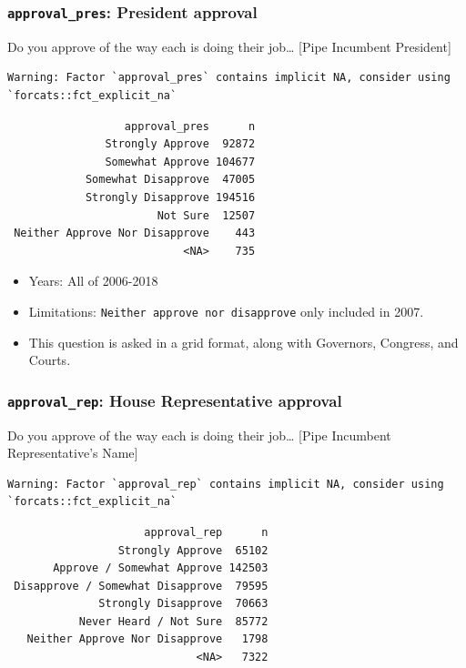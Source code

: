 \documentclass[10pt,article,oneside]{memoir}
\theoremstyle{definition}
\begin{document}
\hypertarget{approval_pres-president-approval}{%
\subsubsection{\texorpdfstring{\texttt{approval\_pres}: President
approval}{approval\_pres: President approval}}\label{approval_pres-president-approval}}

Do you approve of the way each is doing their job\ldots{} {[}Pipe
Incumbent President{]}

\begin{verbatim}
Warning: Factor `approval_pres` contains implicit NA, consider using
`forcats::fct_explicit_na`
\end{verbatim}

\begin{verbatim}
                  approval_pres      n
               Strongly Approve  92872
               Somewhat Approve 104677
            Somewhat Disapprove  47005
            Strongly Disapprove 194516
                       Not Sure  12507
 Neither Approve Nor Disapprove    443
                           <NA>    735
\end{verbatim}

\begin{itemize}
\tightlist
\item
  Years: All of 2006-2018
\item
  Limitations: \texttt{Neither\ approve\ nor\ disapprove} only included
  in 2007.
\item
  This question is asked in a grid format, along with Governors,
  Congress, and Courts.
\end{itemize}

\hypertarget{approval_rep-house-representative-approval}{%
\subsubsection{\texorpdfstring{\texttt{approval\_rep}: House
Representative
approval}{approval\_rep: House Representative approval}}\label{approval_rep-house-representative-approval}}

Do you approve of the way each is doing their job\ldots{} {[}Pipe
Incumbent Representative's Name{]}

\begin{verbatim}
Warning: Factor `approval_rep` contains implicit NA, consider using
`forcats::fct_explicit_na`
\end{verbatim}

\begin{verbatim}
                     approval_rep      n
                 Strongly Approve  65102
       Approve / Somewhat Approve 142503
 Disapprove / Somewhat Disapprove  79595
              Strongly Disapprove  70663
           Never Heard / Not Sure  85772
   Neither Approve Nor Disapprove   1798
                             <NA>   7322
\end{verbatim}
\end{document}
